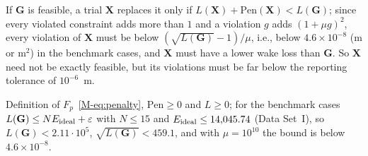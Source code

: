 \begin{lemS}
\label{lem:S-feas-improve}
If $\mathbf G$ is feasible, a trial $\mathbf X$ replaces it only if $L(\mathbf X)+\mathrm{Pen}(\mathbf X)<L(\mathbf G)$; since every violated constraint adds more than $1$ and a violation $g$ adds $(1+\mu g)^2$, every violation of $\mathbf X$ must be below $(\sqrt{L(\mathbf G)}-1)/\mu$, i.e., below $4.6\times10^{-8}$ (m or m$^2$) in the benchmark cases, and $\mathbf X$ must have a lower wake loss than $\mathbf G$. So $\mathbf X$ need not be exactly feasible, but its violations must be far below the reporting tolerance of $10^{-6}$~m.
\end{lemS}
\begin{thSproof}
Definition of $F_p$~\eqref{M-eq:penalty}, $\mathrm{Pen}\ge0$ and $L\ge0$; for the benchmark cases $L(\mathbf G)\le NE_{\rm ideal}+\varepsilon$ with $N\le15$ and $E_{\rm ideal}\le14{,}045.74$ (Data Set~I), so $L(\mathbf G)<2.11\cdot10^5$, $\sqrt{L(\mathbf G)}<459.1$, and with $\mu=10^{10}$ the bound is below $4.6\times10^{-8}$. %
\end{thSproof}


